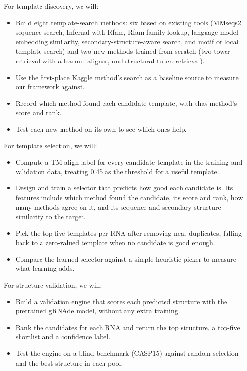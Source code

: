 \documentclass{FastFyp}
\begin{document}
For template discovery, we will:
\begin{itemize}
\item Build eight template-search methods: six based on existing tools (MMseqs2 sequence search, Infernal with Rfam, Rfam family lookup, language-model embedding similarity, secondary-structure-aware search, and motif or local template search) and two new methods trained from scratch (two-tower retrieval with a learned aligner, and structural-token retrieval).
\item Use the first-place Kaggle method's search as a baseline source to measure our framework against.
\item Record which method found each candidate template, with that method's score and rank.
\item Test each new method on its own to see which ones help.
\end{itemize}

For template selection, we will:
\begin{itemize}
\item Compute a TM-align label for every candidate template in the training and validation data, treating 0.45 as the threshold for a useful template.
\item Design and train a selector that predicts how good each candidate is. Its features include which method found the candidate, its score and rank, how many methods agree on it, and its sequence and secondary-structure similarity to the target.
\item Pick the top five templates per RNA after removing near-duplicates, falling back to a zero-valued template when no candidate is good enough.
\item Compare the learned selector against a simple heuristic picker to measure what learning adds.
\end{itemize}

For structure validation, we will:
\begin{itemize}
\item Build a validation engine that scores each predicted structure with the pretrained gRNAde model, without any extra training.
\item Rank the candidates for each RNA and return the top structure, a top-five shortlist and a confidence label.
\item Test the engine on a blind benchmark (CASP15) against random selection and the best structure in each pool.
\end{itemize}
\end{document}
